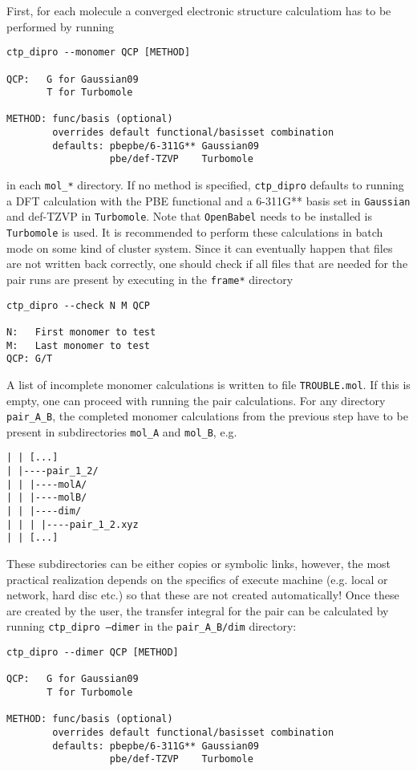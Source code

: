 First, for each molecule a converged electronic structure calculatiom has to be performed by running 
\begin{verbatim}
ctp_dipro --monomer QCP [METHOD]

QCP:   G for Gaussian09
       T for Turbomole

METHOD: func/basis (optional)
        overrides default functional/basisset combination
        defaults: pbepbe/6-311G** Gaussian09
                  pbe/def-TZVP    Turbomole
\end{verbatim}
in each {\tt mol\_*} directory. If no method is specified, {\tt ctp\_dipro} defaults to running a DFT calculation with the PBE functional and a 6-311G** basis set in {\tt Gaussian} and def-TZVP in {\tt Turbomole}. Note that {\tt OpenBabel} needs to be installed is {\tt Turbomole} is used. It is recommended to perform these calculations in batch mode on some kind of cluster system. Since it can eventually happen that files are not written back correctly, one should check if all files that are needed for the pair runs are present by executing in the {\tt frame*} directory
\begin{verbatim}
ctp_dipro --check N M QCP

N:   First monomer to test
M:   Last monomer to test
QCP: G/T 
\end{verbatim}
A list of incomplete monomer calculations is written to file {\tt TROUBLE.mol}. If this is empty, one can proceed with running the pair calculations. For any directory {\tt pair\_A\_B}, the completed monomer calculations from the previous step have to be present in subdirectories {\tt mol\_A} and {\tt mol\_B}, e.g.
\begin{verbatim}
| | [...]
| |----pair_1_2/
| | |----molA/
| | |----molB/
| | |----dim/
| | | |----pair_1_2.xyz
| | [...]
\end{verbatim}
These subdirectories can be either copies or symbolic links, however, the most practical realization depends on the specifics of execute machine (e.g. local or network, hard disc etc.) so that these are not created automatically! Once these are created by the user, the transfer integral for the pair can be calculated by running {\tt ctp\_dipro --dimer} in the {\tt pair\_A\_B/dim} directory:
 \begin{verbatim}
ctp_dipro --dimer QCP [METHOD]

QCP:   G for Gaussian09
       T for Turbomole

METHOD: func/basis (optional)
        overrides default functional/basisset combination
        defaults: pbepbe/6-311G** Gaussian09
                  pbe/def-TZVP    Turbomole
\end{verbatim}
